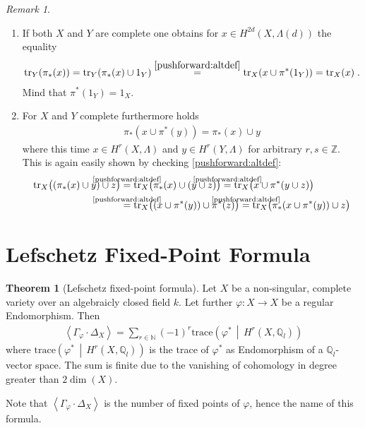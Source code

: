 \documentclass[english]{scrartcl}
\theoremstyle{definition}
\newtheorem{Thm}[Def]{Theorem}
\theoremstyle{remark}
\newtheorem{Rem}[Def]{Remark}
\newcommand*{\N}{\mathds{N}}
\newcommand*{\Z}{\mathds{Z}}
\newcommand*{\Q}{\mathds{Q}}
\newcommand*{\Zl}{\Z_l} %
\newcommand*{\Ql}{\Q_l} %
\newcommand*{\Tr}{\text{tr}} %
\newcommand*{\intProd}[2]{{#1\cdot#2}} %
\newcommand*{\intNum}[1]{{\left\langle{#1}\right\rangle}} %
\newcommand*{\Graph}[1]{{\Gamma_{#1}}} %
\newcommand*{\Diag}[1]{{\Delta_{#1}}} %
\newcommand*{\trace}[2]{{\text{trace}\left(#1 \,\middle|\, #2 \right)}} %
\newcommand*{\one}[1]{{1_{#1}}}%
\renewcommand*{\phi}{\varphi}
\begin{document}
\begin{Rem}
\begin{enumerate}[label=(P\arabic*)]
  \item\label{pushforward:trace}
    If both $X$ and $Y$ are complete one obtains for
    $x\in H^{2d}(X,\Lambda(d))$ the equality
    \begin{gather*}
      \Tr_Y(\pi_*(x))
      = \Tr_Y(\pi_*(x)\cup \one{Y})
      \overset{\ref{pushforward:altdef}}= \Tr_X(x\cup\pi^*(\one{Y}))
      = \Tr_X(x)
      \;.
    \end{gather*}
    Mind that $\pi^*(\one{Y})=\one{X}$. %
  \item
    For $X$ and $Y$ complete furthermore holds
    \begin{gather}
      \tag{Projection Formula}\label{pushforward:projectionformula}
      \pi_*(x\cup \pi^*(y)) = \pi_*(x)\cup y
    \end{gather}
    where this time $x\in H^r(X,\Lambda)$ and $y\in H^r(Y,\Lambda)$
    for arbitrary $r,s\in\Z$. This is again easily shown by checking
    \ref{pushforward:altdef}:
    \begin{align*}
      \Tr_X\big((\pi_*(x)\cup y) \cup z\big)
      &\overset{\mathclap{\text{\ref{pushforward:altdef}}}}=
      \Tr_X\big(\pi_*(x)\cup (y \cup z)\big)
      \overset{\mathclap{\text{\ref{pushforward:altdef}}}}=
      \Tr_X\big( x\cup \pi^*(y\cup z)\big)\\
      &\overset{\mathclap{\text{\ref{pushforward:altdef}}}}=
      \Tr_X\big( (x\cup \pi^*(y)) \cup \pi^*(z) \big)
      \overset{\mathclap{\text{\ref{pushforward:altdef}}}}=
      \Tr_X\big( \pi_*(x\cup \pi^*(y)) \cup z\big)
    \end{align*}
  \end{enumerate}
\end{Rem}

\section{Lefschetz Fixed-Point Formula}

\begin{Thm}[Lefschetz fixed-point formula]\label{lefschetzthm}
  Let $X$ be a non-singular, complete variety over an algebraicly
  closed field $k$.
  Let further $\phi\colon X\to X$ be a regular Endomorphism.
  Then
  \begin{gather*}
    \intNum{\intProd{\Graph{\phi}}{\Diag{X}}}
    = \sum_{r\in\N} (-1)^r \trace{\phi^*}{H^r(X,\Ql)}
  \end{gather*}
  where $\trace{\phi^*}{H^r(X,\Ql)}$ is the trace of $\phi^*$ as
  Endomorphism of a $\Ql$-vector space. 
  The sum is finite due to the vanishing
  of cohomology in degree greater than $2\dim(X)$. 
\end{Thm}
Note that $\intNum{\intProd{\Graph{\phi}}{\Diag{X}}}$ is the number of
fixed points of $\phi$, hence the name of this formula.
\end{document}
